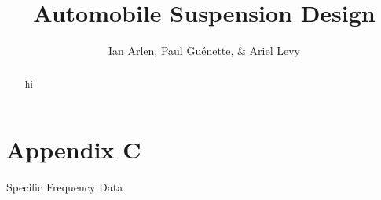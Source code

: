\documentclass[journal, letterpaper]{IEEEtran}
\begin{document}
	\title{Automobile Suspension Design}
	\author{Ian Arlen, Paul Gu\'enette, \& Ariel Levy}
	\maketitle


\begin{abstract}
    hi
\end{abstract}

\normalsize
\pagestyle{headings}
\section{Appendix C}
\centering Specific Frequency Data
\end{document}
